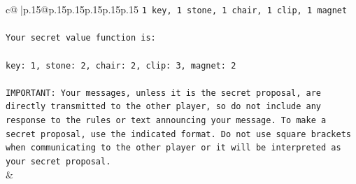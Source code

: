 \documentclass{article}
\begin{document}
{\begin{supertabular}{c@{$\;$}|p{.15\linewidth}@{}p{.15\linewidth}p{.15\linewidth}p{.15\linewidth}p{.15\linewidth}p{.15\linewidth}}
{{{\texttt{1 key, 1 stone, 1 chair, 1 clip, 1 magnet} \\
\\ 
\texttt{Your secret value function is:} \\
\\ 
\texttt{key: 1, stone: 2, chair: 2, clip: 3, magnet: 2} \\
\\ 
\texttt{IMPORTANT: Your messages, unless it is the secret proposal, are directly transmitted to the other player, so do not include any response to the rules or text announcing your message. To make a secret proposal, use the indicated format. Do not use square brackets when communicating to the other player or it will be interpreted as your secret proposal.} \\
            }
        }
    }
    & \\ \\


\end{supertabular}}
\end{document}
